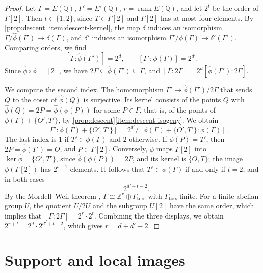 \documentclass[12pt,oneside,openany]{book}
\theoremstyle{definition}
\theoremstyle{plain}
\numberwithin{equation}{chapter}
\theoremstyle{plain}
\theoremstyle{definition}
\theoremstyle{remark}
\newcommand{\Q}{\mathbb Q}
\newcommand{\Z}{\mathbb Z}
\DeclareMathOperator{\rk}{rank}
\newcommand{\dual}{\hat\phi}
\begin{document}
\begin{proof}
Let $\Gamma=E(\Q)$, $\Gamma'=E'(\Q)$, $r=\rk E(\Q)$, and let $2^t$ be the order of $\Gamma[2]$. Then $t\in\{1,2\}$, since $T\in\Gamma[2]$ and $\Gamma[2]$ has at most four elements. By \cref{prop:descent}\ref{item:descent-kernel}, the map $\delta$ induces an isomorphism $\Gamma/\dual(\Gamma')\to\delta(\Gamma)$, and $\delta'$ induces an isomorphism $\Gamma'/\phi(\Gamma)\to\delta'(\Gamma')$. Comparing orders, we find
\begin{equation}\label{eq:rank-indices}
[\Gamma:\dual(\Gamma')]=2^d,\qquad[\Gamma':\phi(\Gamma)]=2^{d'}.
\end{equation}
Since $\dual\circ\phi=[2]$, we have $2\Gamma\subseteq\dual(\Gamma')\subseteq\Gamma$, and $[\Gamma:2\Gamma]=2^d[\dual(\Gamma'):2\Gamma]$.

We compute the second index. The homomorphism $\Gamma'\to\dual(\Gamma')/2\Gamma$ that sends $Q$ to the coset of $\dual(Q)$ is surjective. Its kernel consists of the points $Q$ with $\dual(Q)=2P=\dual(\phi(P))$ for some $P\in\Gamma$, that is, of the points of $\phi(\Gamma)+\{O',T'\}$, by \cref{prop:descent}\ref{item:descent-isogeny}. We obtain
\begin{equation}
[\dual(\Gamma'):2\Gamma]=[\Gamma':\phi(\Gamma)+\{O',T'\}]=2^{d'}/[\phi(\Gamma)+\{O',T'\}:\phi(\Gamma)].
\end{equation}
The last index is $1$ if $T'\in\phi(\Gamma)$ and $2$ otherwise. If $\phi(P)=T'$, then $2P=\dual(T')=O$, and $P\in\Gamma[2]$. Conversely, $\phi$ maps $\Gamma[2]$ into $\ker\dual=\{O',T'\}$, since $\dual(\phi(P))=2P$, and its kernel is $\{O,T\}$; the image $\phi(\Gamma[2])$ has $2^{t-1}$ elements. It follows that $T'\in\phi(\Gamma)$ if and only if $t=2$, and in both cases
\begin{equation}
[\dual(\Gamma'):2\Gamma]=2^{d'+t-2}.
\end{equation}
By the Mordell--Weil theorem \cite[Theorem~VIII.6.7]{SilvermanAEC}, $\Gamma\cong\Z^r\oplus\Gamma_{\mathrm{tors}}$ with $\Gamma_{\mathrm{tors}}$ finite. For a finite abelian group $U$, the quotient $U/2U$ and the subgroup $U[2]$ have the same order, which implies that $[\Gamma:2\Gamma]=2^r\cdot2^t$. Combining the three displays, we obtain $2^{r+t}=2^d\cdot2^{d'+t-2}$, which gives $r=d+d'-2$.
\end{proof}

\section{Support and local images}\label{sec:descent-local}
\end{document}
